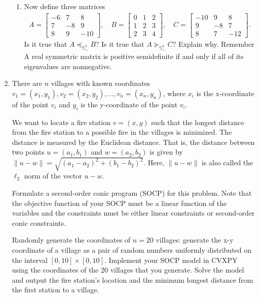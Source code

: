 \documentclass[11pt]{article}
\begin{document}
\begin{enumerate}
\begin{enumerate}
    \item Now define three matrices 
    \begin{align*}
        A = \begin{bmatrix}
            -6 & 7 & 8 \\ 7 & -8 & 9 \\ 8 & 9 & -10
        \end{bmatrix}, \quad 
        B = \begin{bmatrix}
            0 & 1 & 2 \\ 1 & 2 & 3 \\ 2 & 3 & 4
        \end{bmatrix}, \quad
        C = \begin{bmatrix}
            -10 & 9 & 8 \\ 9 & -8 & 7 \\ 8 & 7 & -12            \end{bmatrix}.
    \end{align*}
    Is it true that $A\preceq_{\mathbb{S}^3_+} B$? Is it true that $A \succeq_{\mathbb{S}^3_+} C$? Explain why. Remember A real symmetric matrix is positive semidefinite if and only if all of its eigenvalues are nonnegative.
\end{enumerate}


    \item There are $n$ villages with known coordinates $v_1=(x_1,y_1), v_2=(x_2,y_2), \dots, v_n=(x_n,y_n)$, where $x_i$ is the x-coordinate of the point $v_i$ and $y_i$ is the y-coordinate of the point $v_i$.
    
    We want to locate a fire station $v=(x,y)$ such that the longest distance from the fire station to a possible fire in the villages is minimized. The distance is measured by the Euclidean distance. That is, the distance between two points $u=(a_1,b_1)$ and $w=(a_2,b_2)$ is given by $\|u-w\|=\sqrt{(a_1-a_2)^2+(b_1-b_2)^2}$. Here, $\|u-w\|$ is also called the $\ell_2$ norm of the vector $u-w$.
    
    Formulate a second-order conic program (SOCP) for this problem. Note that the objective function of your SOCP must be a linear function of the variables and the constraints must be either linear constraints or second-order conic constraints.
    
    Randomly generate the coordinates of $n=20$ villages: generate the x-y coordinate of a village as a pair of random numbers uniformly distributed on the interval $[0,10]\times[0,10]$. Implement your SOCP model in CVXPY using the coordinates of the 20 villages that you generate. Solve the model and output the fire station's location and the minimum longest distance from the first station to a village.
    



    
\end{enumerate}
\end{document}
